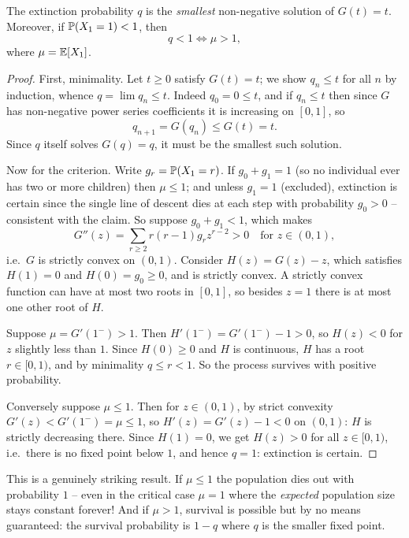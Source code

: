 \documentclass[a4paper]{scrartcl}
\begin{document}
\begin{theorem}
	The extinction probability $q$ is the \emph{smallest} non-negative solution of $G(t) = t$. Moreover, if $\mathbb{P}(X_1 = 1) < 1$, then
	$$
	q < 1 \iff \mu > 1,
	$$
	where $\mu = \mathbb{E}[X_1]$.
\end{theorem}
\begin{proof}
	First, minimality. Let $t \geq 0$ satisfy $G(t) = t$; we show $q_n \leq t$ for all $n$ by induction, whence $q = \lim q_n \leq t$. Indeed $q_0 = 0 \leq t$, and if $q_n \leq t$ then since $G$ has non-negative power series coefficients it is increasing on $[0, 1]$, so
	$$
	q_{n + 1} = G(q_n) \leq G(t) = t.
	$$
	Since $q$ itself solves $G(q) = q$, it must be the smallest such solution.

	Now for the criterion. Write $g_r = \mathbb{P}(X_1 = r)$. If $g_0 + g_1 = 1$ (so no individual ever has two or more children) then $\mu \leq 1$; and unless $g_1 = 1$ (excluded), extinction is certain since the single line of descent dies at each step with probability $g_0 > 0$ -- consistent with the claim. So suppose $g_0 + g_1 < 1$, which makes
	$$
	G''(z) = \sum_{r \geq 2} r(r - 1)g_r z^{r - 2} > 0 \quad \text{for } z \in (0, 1),
	$$
	i.e.\ $G$ is strictly convex on $(0, 1)$. Consider $H(z) = G(z) - z$, which satisfies $H(1) = 0$ and $H(0) = g_0 \geq 0$, and is strictly convex. A strictly convex function can have at most two roots in $[0,1]$, so besides $z = 1$ there is at most one other root of $H$.

	Suppose $\mu = G'(1^-) > 1$. Then $H'(1^-) = G'(1^-) - 1 > 0$, so $H(z) < 0$ for $z$ slightly less than $1$. Since $H(0) \geq 0$ and $H$ is continuous, $H$ has a root $r \in [0, 1)$, and by minimality $q \leq r < 1$. So the process survives with positive probability.

	Conversely suppose $\mu \leq 1$. Then for $z \in (0,1)$, by strict convexity $G'(z) < G'(1^-) = \mu \leq 1$, so $H'(z) = G'(z) - 1 < 0$ on $(0, 1)$: $H$ is strictly decreasing there. Since $H(1) = 0$, we get $H(z) > 0$ for all $z \in [0, 1)$, i.e.\ there is no fixed point below $1$, and hence $q = 1$: extinction is certain.
\end{proof}

This is a genuinely striking result. If $\mu \leq 1$ the population dies out with probability $1$ -- even in the critical case $\mu = 1$ where the \emph{expected} population size stays constant forever! And if $\mu > 1$, survival is possible but by no means guaranteed: the survival probability is $1 - q$ where $q$ is the smaller fixed point.
\end{document}
